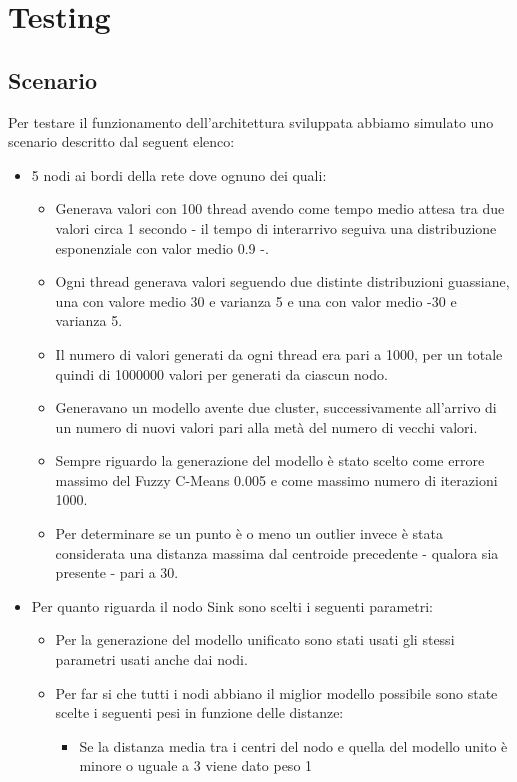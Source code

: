 \chapter{Testing}
\section{Scenario}
Per testare il funzionamento dell'architettura sviluppata abbiamo simulato uno scenario descritto dal seguent elenco:
\begin{itemize}
  \item 5 nodi ai bordi della rete dove ognuno dei quali:
    \begin{itemize}
      \item Generava valori con 100 thread avendo come tempo medio attesa tra due valori circa 1 secondo - il tempo di interarrivo seguiva una distribuzione esponenziale con valor medio 0.9 -.
      \item Ogni thread generava valori seguendo due distinte distribuzioni guassiane, una con valore medio 30 e varianza 5 e una con valor medio -30 e varianza 5.
      \item Il numero di valori generati da ogni thread era pari a 1000, per un totale quindi di 1000000 valori per generati da ciascun nodo.
      \item Generavano un modello avente due cluster, successivamente all'arrivo di un numero di nuovi valori pari alla metà del numero di vecchi valori.
      \item Sempre riguardo la generazione del modello è stato scelto come errore massimo del Fuzzy C-Means 0.005 e come massimo numero di iterazioni 1000.
      \item Per determinare se un punto è o meno un outlier invece è stata considerata una distanza massima dal centroide precedente - qualora sia presente - pari a 30.
    \end{itemize}
  \item Per quanto riguarda il nodo Sink sono scelti i seguenti parametri:
    \begin{itemize}
      \item Per la generazione del modello unificato sono stati usati gli stessi parametri usati anche dai nodi.
      \item Per far si che tutti i nodi abbiano il miglior modello possibile sono state scelte i seguenti pesi in funzione delle distanze:
          \begin{itemize}
            \item Se la distanza media tra i centri del nodo e quella del modello unito è minore o uguale a 3 viene dato peso 1

\end{itemize}
\end{itemize}
\end{itemize}
